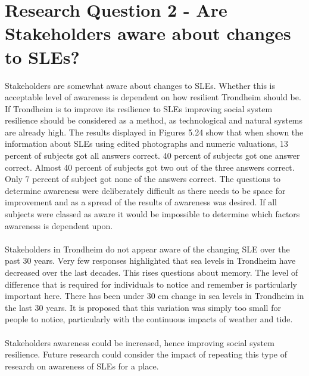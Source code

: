 \section{Research Question 2 - Are Stakeholders aware about changes to SLEs?}

Stakeholders are somewhat aware about changes to SLEs. Whether this is acceptable level of awareness is dependent on how resilient Trondheim should be. If Trondheim is to improve its resilience to SLEs improving social system resilience should be considered as a method, as technological and natural systems are already high. The results displayed in Figures 5.24 show that when shown the information about SLEs using edited photographs and numeric valuations, 13 percent of subjects got all answers correct. 40 percent of subjects got one answer correct. Almost 40 percent of subjects got two out of the three answers correct. Only 7 percent of subject got none of the answers correct. The questions to determine awareness were deliberately difficult as there needs to be space for improvement and as a spread of the results of awareness was desired. If all subjects were classed as aware it would be impossible to determine which factors awareness is dependent upon. 
\paragraph{}
Stakeholders in Trondheim do not appear aware of the changing SLE over the past 30 years. Very few responses highlighted that sea levels in Trondheim have decreased over the last decades. This rises questions about memory. The level of difference that is required for individuals to notice and remember is particularly important here. There has been under 30 cm change in sea levels in Trondheim in the last 30 years. It is proposed that this variation was simply too small for people to notice, particularly with the continuous impacts of weather and tide. 

\paragraph{}
Stakeholders awareness could be increased, hence improving social system resilience. Future research could consider the impact of repeating this type of research on awareness of SLEs for a place. 
\paragraph{}

